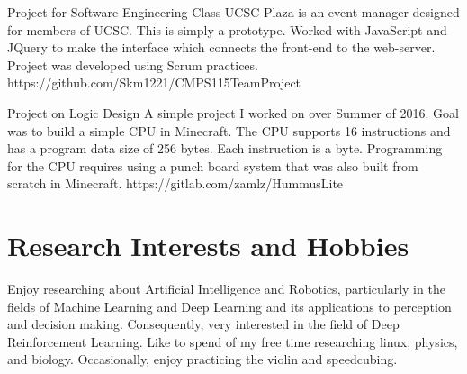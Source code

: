 \documentclass{cv}
\begin{document}
\begin{adjustwidth}{0.5cm}{0.5cm}
{Project for Software Engineering Class}
{UCSC Plaza is an event manager designed for members of UCSC. This is simply
a prototype. Worked with JavaScript and JQuery to make the interface which
connects the front-end to the web-server. Project was developed using Scrum
practices.}
{https://github.com/Skm1221/CMPS115TeamProject}

{Project on Logic Design}
{A simple project I worked on over Summer of 2016. Goal was to build a simple
CPU in Minecraft. The CPU supports 16 instructions and has a program data
size of 256 bytes. Each instruction is a byte. Programming for the CPU
requires using a punch board system that was also built from scratch in
Minecraft.}
{https://gitlab.com/zamlz/HummusLite}
\end{adjustwidth}

\section{Research Interests and Hobbies}
\begin{adjustwidth}{0.5cm}{0.5cm}
Enjoy researching about Artificial Intelligence and Robotics,
particularly in the fields of Machine Learning and
Deep Learning and its applications to perception and
decision making. Consequently, very interested in the field of
Deep Reinforcement Learning. Like to spend of my free time
researching linux, physics, and biology. Occasionally,
enjoy practicing the violin and speedcubing.

\end{adjustwidth}
\end{document}
